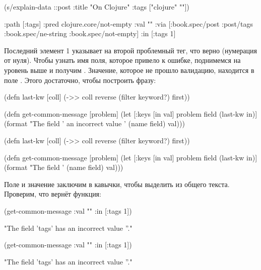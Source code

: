 \else

\begin{clojure}
(s/explain-data ::post {:title "On Clojure"
                        :tags ["clojure" ""]})

{:path [:tags]
 :pred clojure.core/not-empty
 :val ""
 :via [:book.spec/post
       :post/tags
       :book.spec/ne-string
       :book.spec/not-empty]
 :in [:tags 1]}
\end{clojure}

\fi

Последний элемент 1 указывает на второй проблемный тег, что верно (нумерация от
нуля). Чтобы узнать имя поля, которое привело к ошибке, поднимемся на уровень
выше и получим . Значение, которое не прошло валидацию, находится в
поле . Этого достаточно, чтобы построить фразу:

\ifnarrow

\begin{clojure}
(defn last-kw [coll]
  (->> coll
       reverse
       (filter keyword?)
       first))

(defn get-common-message
  [problem]
  (let [{:keys [in val]} problem
        field (last-kw in)]
    (format
      "The field '%
                an incorrect value '%
      (name field) val)))
\end{clojure}

\else

\begin{clojure}
(defn last-kw [coll]
  (->> coll
       reverse
       (filter keyword?)
       first))

(defn get-common-message
  [problem]
  (let [{:keys [in val]} problem
        field (last-kw in)]
    (format "The field '%
            (name field) val)))
\end{clojure}

\fi

Поле и значение заключим в кавычки, чтобы выделить из общего текста. Проверим,
что вернёт функция:

\ifnarrow

\begin{clojure}
(get-common-message
  {:val "" :in [:tags 1]})

"The field 'tags' has
          an incorrect value ''."
\end{clojure}

\else

\begin{clojure}
(get-common-message {:val "" :in [:tags 1]})

"The field 'tags' has an incorrect value ''."
\end{clojure}


